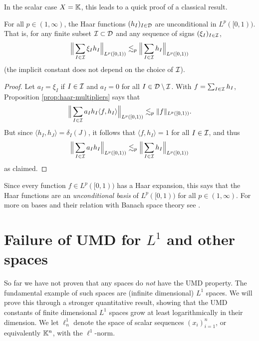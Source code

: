 In the scalar case $X = \mathbb{K}$, this leads to a quick proof of a classical result.

\begin{cor}
  For all $p \in (1,\infty)$, the Haar functions $(h_{I})_{I \in \mathcal{D}}$ are unconditional in $L^p([0,1))$.
  That is, for any finite subset $\mathcal{I} \subset \mathcal{D}$ and any sequence of signs $(\xi_{I})_{I \in \mathcal{I}}$,
  \begin{equation*}
    \Big\| \sum_{I \in \mathcal{I}} \xi_{I} h_{I} \Big\|_{L^p([0,1))} \lesssim_{p} \Big\| \sum_{I \in \mathcal{I}} h_{I} \Big\|_{L^p([0,1))}
  \end{equation*}
  (the implicit constant does not depend on the choice of $\mathcal{I}$).
\end{cor}

\begin{proof}
  Let $a_{I} = \xi_{I}$ if $I \in \mathcal{I}$ and $a_{I} = 0$ for all $I \in \mathcal{D} \setminus \mathcal{I}$.
  With $f = \sum_{I \in \mathcal{I}} h_{I}$, Proposition \ref{prop:haar-multipliers} says that
  \begin{equation*}
    \Big\|\sum_{I \in \mathcal{I}} a_{I} h_{I} \langle f, h_{I} \rangle \Big\|_{L^p([0,1))} \lesssim_{p} \|f\|_{L^p([0,1))}.
  \end{equation*}
  But since $\langle h_{I}, h_{J} \rangle = \delta_{I}(J)$, it follows that $\langle f, h_{I} \rangle = 1$ for all $I \in \mathcal{I}$, and thus
  \begin{equation*}
    \Big\|\sum_{I \in \mathcal{I}} a_{I} h_{I} \Big\|_{L^p([0,1))} \lesssim_{p} \Big\| \sum_{I \in \mathcal{I}} h_{I}\Big\|_{L^p([0,1))}
  \end{equation*}
  as claimed.
\end{proof}

Since every function $f \in L^p([0,1))$ has a Haar expansion, this says that the Haar functions are an \emph{unconditional basis} of $L^p([0,1))$ for all $p \in (1,\infty)$.
For more on bases and their relation with Banach space theory see \cite{AK06}.

\section{Failure of UMD for $L^1$ and other spaces}

So far we have not proven that any spaces do \emph{not} have the UMD property.
The fundamental example of such spaces are (infinite dimensional) $L^1$ spaces.
We will prove this through a stronger quantitative result, showing that the UMD constants of finite dimensional $L^1$ spaces grow at least logarithmically in their dimension.
We let $\ell^1_{n}$ denote the space of scalar sequences $(x_{i})_{i=1}^{n}$, or equivalently $\mathbb{K}^n$, with the $\ell^1$-norm.

